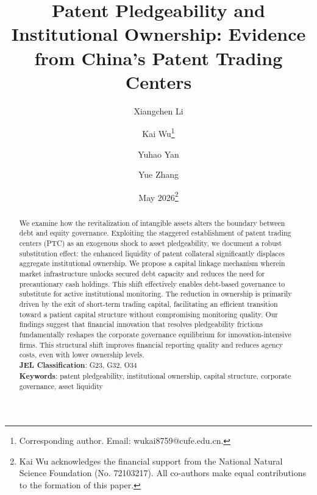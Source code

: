 \documentclass[12pt,a4paper]{article}
\begin{document}
\begin{titlepage}
\title{\textbf{Patent Pledgeability and Institutional Ownership: Evidence from China’s Patent Trading Centers}}
\author[a]{Xiangchen Li}
\author[b]{Kai Wu\thanks{Corresponding author. Email: wukai8759@cufe.edu.cn.}}
\author[b]{Yuhao Yan}
\author[b]{Yue Zhang}

\date{May 2026\thanks{Kai Wu acknowledges the financial support from the National Natural Science Foundation (No. 72103217). All co-authors make equal contributions to the formation of this paper.}}

\maketitle
{}

\begin{abstract}
We examine how the revitalization of intangible assets alters the boundary between debt and equity governance. Exploiting the staggered establishment of patent trading centers (PTC) as an exogenous shock to asset pledgeability, we document a robust substitution effect: the enhanced liquidity of patent collateral significantly displaces aggregate institutional ownership. We propose a capital linkage mechanism wherein market infrastructure unlocks secured debt capacity and reduces the need for precautionary cash holdings. This shift effectively enables debt-based governance to substitute for active institutional monitoring. The reduction in ownership is primarily driven by the exit of short-term trading capital, facilitating an efficient transition toward a patient capital structure without compromising monitoring quality. Our findings suggest that financial innovation that resolves pledgeability frictions fundamentally reshapes the corporate governance equilibrium for innovation-intensive firms. This structural shift improves financial reporting quality and reduces agency costs, even with lower ownership levels.\\
\textbf{JEL Classification}: G23, G32, O34 \\
\textbf{Keywords}: patent pledgeability, institutional ownership, capital structure, corporate governance, asset liquidity \\
\end{abstract}

\setcounter{page}{0}
\thispagestyle{empty}
\end{titlepage}
\end{document}
